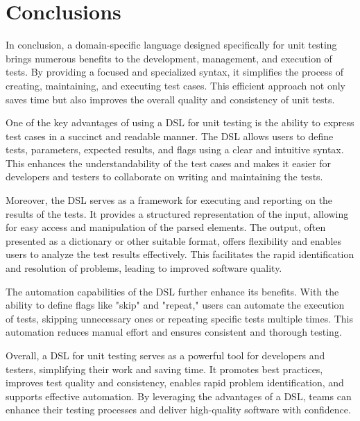 \chapter*{Conclusions}

In conclusion, a domain-specific language designed specifically for unit testing brings numerous benefits to the development, management, and execution of tests. By providing a focused and specialized syntax, it simplifies the process of creating, maintaining, and executing test cases. This efficient approach not only saves time but also improves the overall quality and consistency of unit tests.

One of the key advantages of using a DSL for unit testing is the ability to express test cases in a succinct and readable manner. The DSL allows users to define tests, parameters, expected results, and flags using a clear and intuitive syntax. This enhances the understandability of the test cases and makes it easier for developers and testers to collaborate on writing and maintaining the tests.

Moreover, the DSL serves as a framework for executing and reporting on the results of the tests. It provides a structured representation of the input, allowing for easy access and manipulation of the parsed elements. The output, often presented as a dictionary or other suitable format, offers flexibility and enables users to analyze the test results effectively. This facilitates the rapid identification and resolution of problems, leading to improved software quality.

The automation capabilities of the DSL further enhance its benefits. With the ability to define flags like "skip" and "repeat," users can automate the execution of tests, skipping unnecessary ones or repeating specific tests multiple times. This automation reduces manual effort and ensures consistent and thorough testing.

Overall, a DSL for unit testing serves as a powerful tool for developers and testers, simplifying their work and saving time. It promotes best practices, improves test quality and consistency, enables rapid problem identification, and supports effective automation. By leveraging the advantages of a DSL, teams can enhance their testing processes and deliver high-quality software with confidence.
